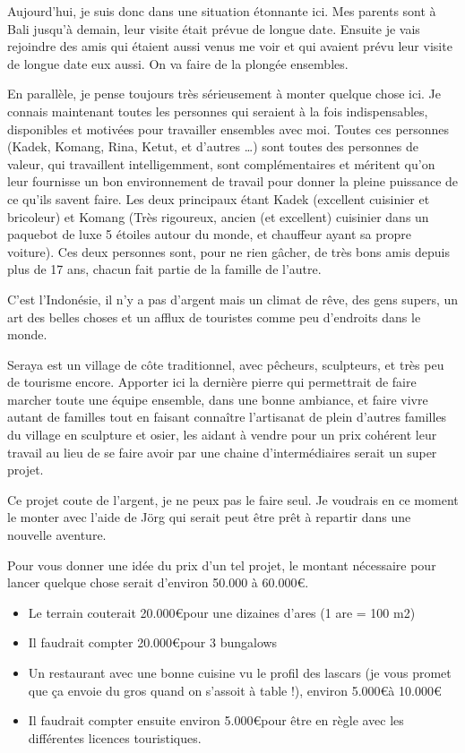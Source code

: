 Aujourd’hui, je suis donc dans une situation étonnante ici. Mes parents sont à Bali jusqu’à demain, leur visite était prévue de longue date. Ensuite je vais rejoindre des amis qui étaient aussi venus me voir et qui avaient prévu leur visite de longue date eux aussi. On va faire de la plongée ensembles.

En parallèle, je pense toujours très sérieusement à monter quelque chose ici. Je connais maintenant toutes les personnes qui seraient à la fois indispensables, disponibles et motivées pour travailler ensembles avec moi. Toutes ces personnes (Kadek, Komang, Rina, Ketut, et d’autres …) sont toutes des personnes de valeur, qui travaillent intelligemment, sont complémentaires et méritent qu’on leur fournisse un bon environnement de travail pour donner la pleine puissance de ce qu’ils savent faire. Les deux principaux étant Kadek (excellent cuisinier et bricoleur) et Komang (Très rigoureux, ancien (et excellent) cuisinier dans un paquebot de luxe 5 étoiles autour du monde, et chauffeur ayant sa propre voiture). Ces deux personnes sont, pour ne rien gâcher, de très bons amis depuis plus de 17 ans, chacun fait partie de la famille de l’autre.

C’est l’Indonésie, il n’y a pas d’argent mais un climat de rêve, des gens supers, un art des belles choses et un afflux de touristes comme peu d’endroits dans le monde.

Seraya est un village de côte traditionnel, avec pêcheurs, sculpteurs, et très peu de tourisme encore. Apporter ici la dernière pierre qui permettrait de faire marcher toute une équipe ensemble, dans une bonne ambiance, et faire vivre autant de familles tout en faisant connaître l’artisanat de plein d’autres familles du village en sculpture et osier, les aidant à vendre pour un prix cohérent leur travail au lieu de se faire avoir par une chaine d’intermédiaires serait un super projet.

Ce projet coute de l’argent, je ne peux pas le faire seul. Je voudrais en ce moment le monter avec l’aide de Jörg qui serait peut être prêt à repartir dans une nouvelle aventure.

Pour vous donner une idée du prix d’un tel projet, le montant nécessaire pour lancer quelque chose serait d’environ 50.000 à 60.000\euro .

\begin{itemize}
     \item Le terrain couterait 20.000\euro  pour une dizaines d’ares (1 are = 100 m2)
     \item Il faudrait compter 20.000\euro  pour 3 bungalows
     \item Un restaurant avec une bonne cuisine vu le profil des lascars (je vous promet que ça envoie du gros quand on s’assoit à table !), environ 5.000\euro  à 10.000\euro
     \item Il faudrait compter ensuite environ 5.000\euro  pour être en règle avec les différentes licences touristiques.
\end{itemize}

